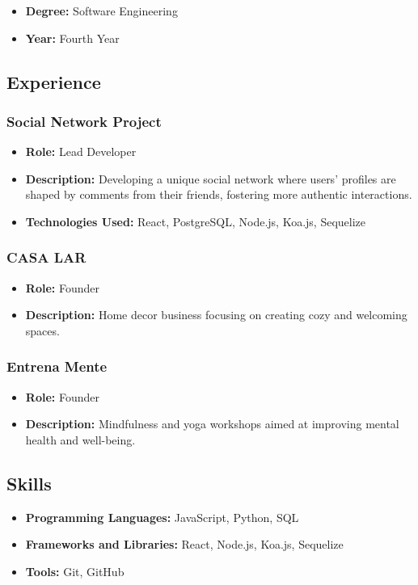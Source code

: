 \documentclass[
]{article}
\providecommand{\tightlist}{%
  \setlength{\itemsep}{0pt}\setlength{\parskip}{0pt}}\usepackage{longtable,booktabs,array}
\begin{document}
\begin{itemize}
\tightlist
\item
  \textbf{Degree:} Software Engineering
\item
  \textbf{Year:} Fourth Year
\end{itemize}

\subsection{Experience}\label{experience}

\subsubsection{Social Network Project}\label{social-network-project}

\begin{itemize}
\tightlist
\item
  \textbf{Role:} Lead Developer
\item
  \textbf{Description:} Developing a unique social network where users'
  profiles are shaped by comments from their friends, fostering more
  authentic interactions.
\item
  \textbf{Technologies Used:} React, PostgreSQL, Node.js, Koa.js,
  Sequelize
\end{itemize}

\subsubsection{CASA LAR}\label{casa-lar}

\begin{itemize}
\tightlist
\item
  \textbf{Role:} Founder
\item
  \textbf{Description:} Home decor business focusing on creating cozy
  and welcoming spaces.
\end{itemize}

\subsubsection{Entrena Mente}\label{entrena-mente}

\begin{itemize}
\tightlist
\item
  \textbf{Role:} Founder
\item
  \textbf{Description:} Mindfulness and yoga workshops aimed at
  improving mental health and well-being.
\end{itemize}

\subsection{Skills}\label{skills}

\begin{itemize}
\tightlist
\item
  \textbf{Programming Languages:} JavaScript, Python, SQL
\item
  \textbf{Frameworks and Libraries:} React, Node.js, Koa.js, Sequelize
\item
  \textbf{Tools:} Git, GitHub
\end{itemize}
\end{document}
